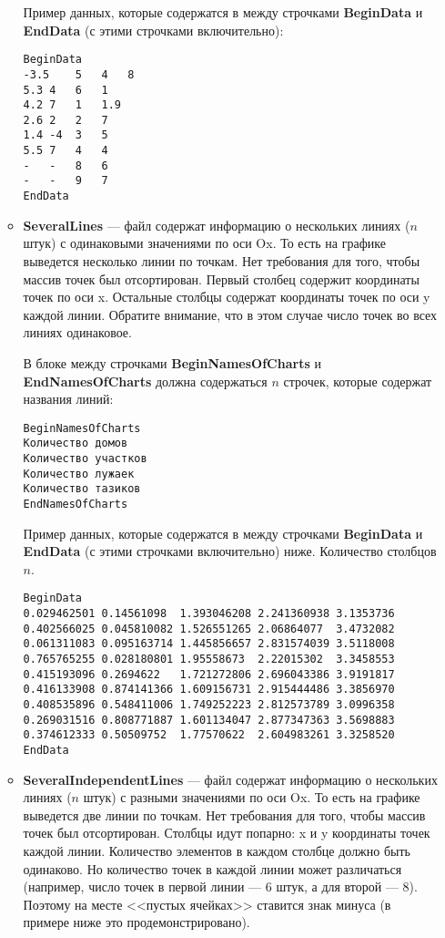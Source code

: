 \documentclass[a4paper,12pt]{article}
\begin{document}
\begin{itemize}
\begin{itemize}
Пример данных, которые содержатся в между строчками \textbf{BeginData} и \textbf{EndData} (с этими строчками включительно):
\begin{lstlisting}[label=Line03_7,caption=Для TwoIndependentLines ]
BeginData
-3.5	5	4	8
5.3	4	6	1
4.2	7	1	1.9
2.6	2	2	7
1.4	-4	3	5
5.5	7	4	4
-	-	8	6
-	-	9	7
EndData
\end{lstlisting}

\item \textbf{SeveralLines} --- файл содержат информацию о нескольких линиях ($n$ штук) с одинаковыми значениями по оси Ox. То есть на графике выведется несколько линии по точкам. Нет требования для того, чтобы массив точек был отсортирован. Первый столбец содержит координаты точек по оси x. Остальные столбцы содержат координаты точек по оси y каждой линии. Обратите внимание, что в этом случае число точек во всех линиях одинаковое.

В блоке между строчками \textbf{BeginNamesOfCharts} и \textbf{EndNamesOfCharts} должна содержаться $ n $ строчек, которые содержат названия линий:
\begin{lstlisting}[label=Line03_8,caption=Для SeveralLines ]
BeginNamesOfCharts
Количество домов
Количество участков
Количество лужаек
Количество тазиков
EndNamesOfCharts
\end{lstlisting}

Пример данных, которые содержатся в между строчками \textbf{BeginData} и \textbf{EndData} (с этими строчками включительно) ниже.  Количество столбцов $n$.
\begin{lstlisting}[label=Line03_9,caption=Для SeveralLines ]
BeginData
0.029462501	0.14561098	1.393046208	2.241360938	3.1353736
0.402566025	0.045810082	1.526551265	2.06864077	3.4732082
0.061311083	0.095163714	1.445856657	2.831574039	3.5118008
0.765765255	0.028180801	1.95558673	2.22015302	3.3458553
0.415193096	0.2694622	1.721272806	2.696043386	3.9191817
0.416133908	0.874141366	1.609156731	2.915444486	3.3856970
0.408535896	0.548411006	1.749252223	2.812573789	3.0996358
0.269031516	0.808771887	1.601134047	2.877347363	3.5698883
0.374612333	0.50509752	1.77570622	2.604983261	3.3258520
EndData
\end{lstlisting}

\item \textbf{SeveralIndependentLines} --- файл содержат информацию о нескольких линиях ($n$ штук) с разными значениями по оси Ox. То есть на графике выведется две линии по точкам. Нет требования для того, чтобы массив точек был отсортирован. Столбцы идут попарно: x и y координаты точек каждой линии. Количество элементов в каждом столбце должно быть одинаково. Но количество точек в каждой линии может различаться (например, число точек в первой линии --- 6 штук, а для второй --- 8). Поэтому на месте <<пустых ячейках>> ставится знак минуса (в примере ниже это продемонстрировано).


\end{itemize}
\end{itemize}
\end{document}
